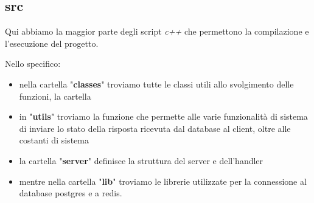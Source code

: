 \documentclass[12pt]{report}
\begin{document}
    \subsection{src}
    Qui abbiamo la maggior parte degli script \textit{c++} che permettono la compilazione e l'esecuzione del progetto.
    
    Nello specifico:
    \begin{itemize}
        \item nella cartella "\textbf{classes}" troviamo tutte le classi utili allo svolgimento delle funzioni, la cartella
        \item in "\textbf{utils}" troviamo la funzione che permette alle varie funzionalità di sistema di inviare lo stato della risposta ricevuta dal database al client, oltre alle costanti di sistema
        \item la cartella "\textbf{server}"  definisce la struttura del server e dell'handler
        \item mentre nella cartella "\textbf{lib}" troviamo le librerie utilizzate per la connessione al database postgres e a redis.
    \end{itemize}   
\end{document}
